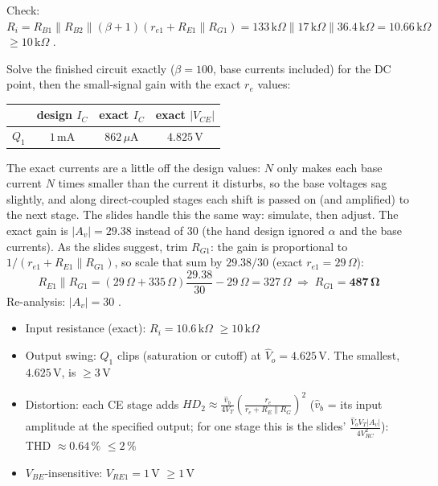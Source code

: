 \documentclass[11pt]{article}
\newcommand{\solstep}[2]{\par\medskip{\color{stepc}\textbf{Step #1 --- #2}}\par\nopagebreak}
\begin{document}
Check: $R_i = R_{B1}\|R_{B2}\|(\beta+1)(r_{e1} + R_{E1}\|R_{G1}) = 133\,\mathrm{k}\Omega\|17\,\mathrm{k}\Omega\|36.4\,\mathrm{k}\Omega = 10.66\,\mathrm{k}\Omega$ $\ge 10\,\mathrm{k}\Omega$ \checkmark.
\solstep{4}{Check by analysis}Solve the finished circuit exactly ($\beta=100$, base currents included) for the DC point, then the small-signal gain with the exact $r_e$ values:\begin{center}\renewcommand{\arraystretch}{1.35}
\begin{tabular}{cccc}
\toprule
 & design $I_C$ & exact $I_C$ & exact $|V_{CE}|$ \\
\midrule
$Q_{1}$ & $1\,\mathrm{m}\mathrm{A}$ & $862\,\mu \mathrm{A}$ & $4.825\,\mathrm{V}$ \\
\bottomrule
\end{tabular}\end{center}
The exact currents are a little off the design values: $N$ only makes each base current $N$ times smaller than the current it disturbs, so the base voltages sag slightly, and along direct-coupled stages each shift is passed on (and amplified) to the next stage. The slides handle this the same way: simulate, then adjust. The exact gain is $|A_v| = 29.38$ instead of $30$ (the hand design ignored $\alpha$ and the base currents). As the slides suggest, trim $R_{G1}$: the gain is proportional to $1/(r_{e1} + R_{E1}\|R_{G1})$, so scale that sum by $29.38/30$ (exact $r_{e1} = 29\,\Omega$):\[R_{E1}\|R_{G1} = (29\,\Omega + 335\,\Omega)\frac{29.38}{30} - 29\,\Omega = 327\,\Omega \;\Rightarrow\; R_{G1} = \mathbf{487\,\Omega}\]Re-analysis: $|A_v| = 30$ \checkmark. \begin{itemize}[leftmargin=*,itemsep=2pt]
\item Input resistance (exact): $R_i = 10.6\,\mathrm{k}\Omega$ $\ge 10\,\mathrm{k}\Omega$ \checkmark
\item Output swing: $Q_{1}$ clips (saturation or cutoff) at $\hat V_o = 4.625\,\mathrm{V}$. The smallest, $4.625\,\mathrm{V}$, is $\ge 3$\,V \checkmark
\item Distortion: each CE stage adds $HD_2 \approx \frac{\hat v_b}{4V_T}\left(\frac{r_e}{r_e + R_E\|R_G}\right)^2$ ($\hat v_b$ = its input amplitude at the specified output; for one stage this is the slides' $\frac{\hat V_o V_T |A_v|}{4V_{RC}^2}$): THD $\approx 0.64\,\%$ $\le 2\,\%$ \checkmark
\item $V_{BE}$-insensitive: $V_{RE1} = 1$\,V $\ge 1$\,V \checkmark
\end{itemize}
\end{document}

